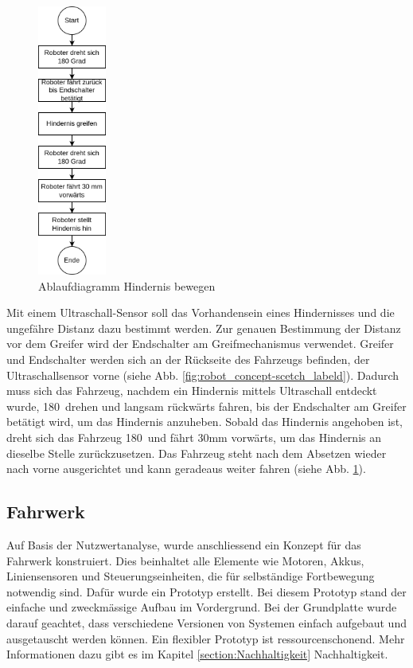 \begin{figure}[H]
\centering
\includegraphics[width=0.2\textwidth]{assets/gesamtkonzept/ablaufdiagramm-hindernis-bewegen.png}
\caption{Ablaufdiagramm Hindernis bewegen}
\label{fig:ablaufdiagramm-hindernis-bewegen}
\end{figure}

 Mit einem Ultraschall-Sensor soll das Vorhandensein eines Hindernisses und die ungefähre Distanz dazu bestimmt werden. Zur genauen Bestimmung der Distanz vor dem Greifer wird der Endschalter am Greifmechanismus verwendet.
Greifer und Endschalter werden sich an der Rückseite des Fahrzeugs befinden, der Ultraschallsensor vorne (siehe Abb. \ref{fig:robot_concept-scetch_labeld}). Dadurch muss sich das Fahrzeug, nachdem ein Hindernis mittels Ultraschall entdeckt wurde, 180\textdegree\ drehen und langsam rückwärts fahren, bis der Endschalter am Greifer betätigt wird, um das Hindernis anzuheben. Sobald das Hindernis angehoben ist, dreht sich das Fahrzeug 180\textdegree\ und fährt 30mm vorwärts, um das Hindernis an dieselbe Stelle zurückzusetzen. Das Fahrzeug steht nach dem Absetzen wieder nach vorne ausgerichtet und kann geradeaus weiter fahren (siehe  Abb. \ref{fig:ablaufdiagramm-hindernis-bewegen}).


\subsection{Fahrwerk}

Auf Basis der Nutzwertanalyse, wurde anschliessend ein Konzept für das Fahrwerk konstruiert. Dies beinhaltet alle Elemente wie Motoren, Akkus, Liniensensoren und Steuerungseinheiten, die für selbständige Fortbewegung notwendig sind. Dafür wurde ein Prototyp erstellt. Bei diesem Prototyp stand der einfache und zweckmässige Aufbau im Vordergrund. Bei der Grundplatte wurde darauf geachtet, dass verschiedene  Versionen von Systemen einfach aufgebaut und ausgetauscht werden können. Ein flexibler Prototyp ist ressourcenschonend. Mehr Informationen dazu gibt es im Kapitel \ref{section:Nachhaltigkeit} Nachhaltigkeit. 

